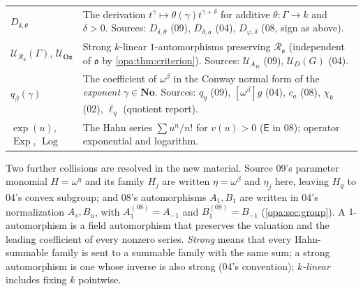 \documentclass[11pt,oneside]{article}
\numberwithin{equation}{section}
\theoremstyle{definition}
\theoremstyle{remark}
\newcommand{\No}{\mathbf{No}}
\newcommand{\Oz}{\mathbf{Oz}}
\newcommand{\oo}{\mathfrak o}
\newcommand{\Ro}{\mathcal R_{\oo}}
\newcommand{\UU}{\mathcal U}
\newcommand{\Exp}{\operatorname{Exp}}
\newcommand{\Log}{\operatorname{Log}}
\begin{document}
\begin{center}
\begin{longtable}{>{\raggedright\arraybackslash}p{}>{\raggedright\arraybackslash}p{}}
$D_{\delta,\theta}$ & The derivation $t^\gamma\mapsto\theta(\gamma)t^{\gamma+\delta}$
for additive $\theta:\Gamma\to k$ and $\delta>0$. Sources: $D_{\delta,\theta}$
(09), $D_{\delta,a}$ (04), $D_{\varphi,\delta}$ (08, sign as above).\\
$\UU_{\Ro}(\Gamma)$, $\UU_\Oz$ & Strong $k$-linear $1$-automorphisms
preserving $\Ro$ (independent of $\oo$ by \cref{opa:thm:criterion}). Sources:
$\UU_{A_D}$ (09), $\mathcal U_D(G)$ (04).\\
$q_\beta(\gamma)$ & The coefficient of $\omega^\beta$ in the Conway normal form
of the \emph{exponent} $\gamma\in\No$. Sources: $q_\eta$ (09), $[\omega^\beta]g$
(04), $c_a$ (08), $\chi_b$ (02), $\ell_\eta$ (quotient report).\\
$\exp(u)$, $\Exp$, $\Log$ & The Hahn series $\sum u^n/n!$ for $v(u)>0$
($\mathsf E$ in 08); operator exponential and logarithm.\\
\bottomrule
\end{longtable}
\end{center}

Two further collisions are resolved in the new material. Source 09's
parameter monomial $H=\omega^\eta$ and its family $H_j$ are written
$\eta=\omega^\beta$ and $\eta_j$ here, leaving $H_g$ to 04's convex
subgroup; and 08's automorphisms $A_1,B_1$ are written in 04's normalization
$A_s,B_u$, with $A_1^{(08)}=A_{-1}$ and $B_1^{(08)}=B_{-1}$
(\cref{opa:sec:group}). A $1$-automorphism is a field automorphism that
preserves the valuation and the leading coefficient of every nonzero series.
\emph{Strong} means that every Hahn-summable family is sent to a summable
family with the same sum; a strong automorphism is one whose inverse is also
strong (04's convention); \emph{$k$-linear} includes fixing $k$ pointwise.
\end{document}
